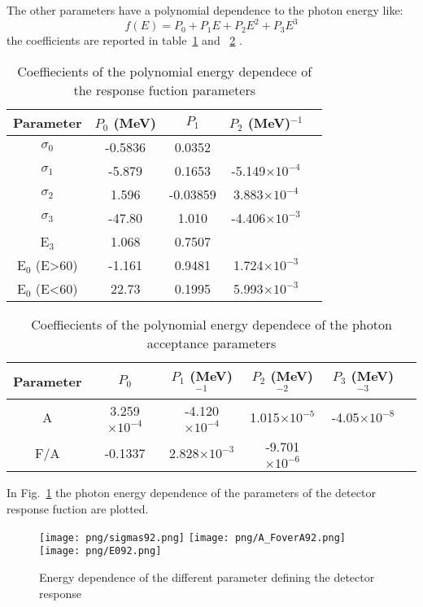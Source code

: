 The other parameters have a polynomial dependence to the photon energy like:
\begin{equation}
f(E)= P_0+P_1E+P_2E^2+P_3E^3
\end{equation} 
the coefficients are reported in table~\ref{tab:coefficients1} and ~\ref{tab:coefficients2} .
\begin{table}[!h]
\begin{center}
\begin{tabular}{| c | c | c | c | c | }
\hline
Parameter & $P_0$ (MeV)& $P_1$ & $P_2$ (MeV)$^{-1}$ \\ \hline
$\sigma_0$ & -0.5836 & 0.0352 & \\ \hline
$\sigma_1$ & -5.879 & 0.1653 & -5.149$\times 10^{-4}$ \\ \hline
$\sigma_2$ & 1.596 & -0.03859 & 3.883$\times 10^{-4}$ \\ \hline
$\sigma_3$ & -47.80 & 1.010 & -4.406$\times 10^{-3}$ \\ \hline
E$_3$ & 1.068 & 0.7507 & \\ \hline
E$_0$ (E>60) & -1.161 & 0.9481 & 1.724$\times 10^{-3}$ \\ \hline
E$_0$ (E<60) & 22.73 & 0.1995 & 5.993$\times 10^{-3}$ \\ \hline

\end{tabular}
\end{center}
\caption{Coeffiecients of the polynomial energy dependece of the response fuction parameters\label{tab:coefficients1}}
\end{table}

\begin{table}[!h]
\begin{center}
\begin{tabular}{| c | c | c | c | c | c |}
\hline
Parameter & $P_0$ & $P_1$ (MeV)$^{-1}$ & $P_2$ (MeV)$^{-2}$  & $P_3$ (MeV)$^{-3}$\\ \hline
A & 3.259$\times 10^{-4}$ & -4.120$\times 10^{-4}$ & 1.015$\times 10^{-5}$ & -4.05$\times 10^{-8}$  \\ \hline
F/A & -0.1337 & 2.828$\times 10^{-3}$ & -9.701$\times 10^{-6}$ & \\ \hline
\end{tabular}
\end{center}
\caption{Coeffiecients of the polynomial energy dependece of the photon acceptance parameters\label{tab:coefficients2}}
\end{table}

In Fig.~\ref{fig:parameterDependance} the photon energy dependence of the parameters of the detector response fuction are plotted.
\begin{figure}[!h]
 \begin{center}
 \texttt{[image: png/sigmas92.png]} 
 \texttt{[image: png/A\_FoverA92.png]} 
 \texttt{[image: png/E092.png]} 
 \end{center}
 \caption{Energy dependence of the different parameter defining the detector response}
 \label{fig:parameterDependance}
 \end{figure}


